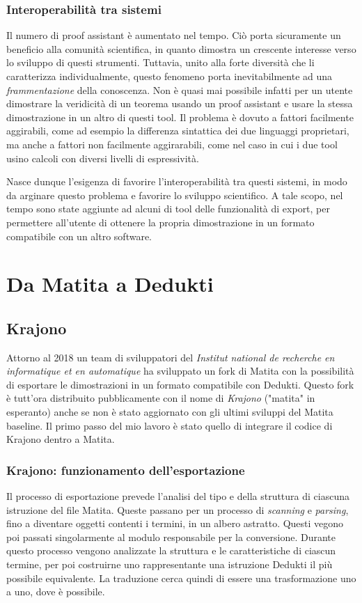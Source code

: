 \documentclass[12pt,a4paper]{report}
\begin{document}
\subsection{Interoperabilità tra sistemi}
Il numero di proof assistant è aumentato nel tempo. Ciò porta sicuramente un
beneficio alla comunità scientifica, in quanto dimostra un crescente interesse
verso lo sviluppo di questi strumenti. Tuttavia, unito alla forte diversità che
li caratterizza individualmente, questo fenomeno porta inevitabilmente
ad una \textit{frammentazione} della conoscenza. Non è quasi mai possibile infatti
per un utente dimostrare la veridicità di un teorema usando un proof assistant
e usare la stessa dimostrazione in un altro di questi tool. Il problema è dovuto
a fattori facilmente aggirabili, come ad esempio la differenza sintattica dei due
linguaggi proprietari, ma anche a fattori non facilmente aggirarabili, come nel
caso in cui i due tool usino calcoli con diversi livelli di espressività.

Nasce dunque l'esigenza di favorire l'interoperabilità tra questi sistemi, in
modo da arginare questo problema e favorire lo sviluppo scientifico. 
A tale scopo, nel tempo sono state aggiunte ad alcuni di tool delle funzionalità
di export, per permettere all'utente di ottenere la propria dimostrazione in un
formato compatibile con un altro software.

\chapter{Da Matita a Dedukti}
\section{Krajono}
Attorno al 2018 un team di sviluppatori del \textit{Institut national de recherche
en informatique et en automatique} %
ha sviluppato un fork di Matita con la possibilità di esportare le dimostrazioni
in un formato compatibile con Dedukti. Questo fork è tutt'ora distribuito 
pubblicamente con il nome di \textit{Krajono} ("matita" in esperanto) anche se 
non è stato aggiornato con gli ultimi sviluppi del Matita baseline.
Il primo passo del mio lavoro è stato quello di integrare il codice di Krajono
dentro a Matita.

\subsection{Krajono: funzionamento dell'esportazione}
Il processo di esportazione prevede l'analisi del tipo e della struttura di 
ciascuna istruzione del file Matita. Queste passano per un processo di 
\textit{scanning} e \textit{parsing}, fino a diventare oggetti contenti i
termini, in un albero astratto. Questi vegono poi passati singolarmente al
modulo responsabile per la conversione. Durante questo processo vengono
analizzate la struttura e le caratteristiche di ciascun termine, per poi
costruirne uno rappresentante una istruzione Dedukti il più possibile
equivalente. La traduzione cerca quindi di essere una trasformazione uno a uno,
dove è possibile.
\end{document}
